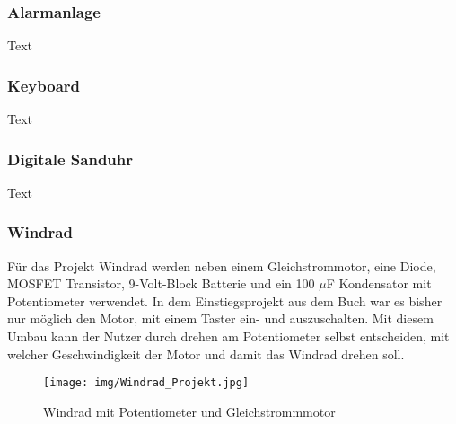 \subsubsection{Alarmanlage}
Text

\subsubsection{Keyboard}
Text

\subsubsection{Digitale Sanduhr}
Text

\subsubsection{Windrad}

Für das Projekt Windrad werden neben einem Gleichstrommotor, eine Diode, MOSFET Transistor, 9-Volt-Block Batterie und ein 100 $\mu$F Kondensator mit Potentiometer verwendet. In dem Einstiegsprojekt aus dem Buch war es bisher nur möglich den Motor, mit einem Taster ein- und auszuschalten. Mit diesem Umbau kann der Nutzer durch drehen am Potentiometer selbst entscheiden, mit welcher Geschwindigkeit der Motor und damit das Windrad drehen soll.
\\

\begin{figure}[h]
\begin{center}
\texttt{[image: img/Windrad\_Projekt.jpg]}
\caption{Windrad mit Potentiometer und Gleichstrommmotor}
\label{Windrad_project}
\end{center}
\end{figure}
